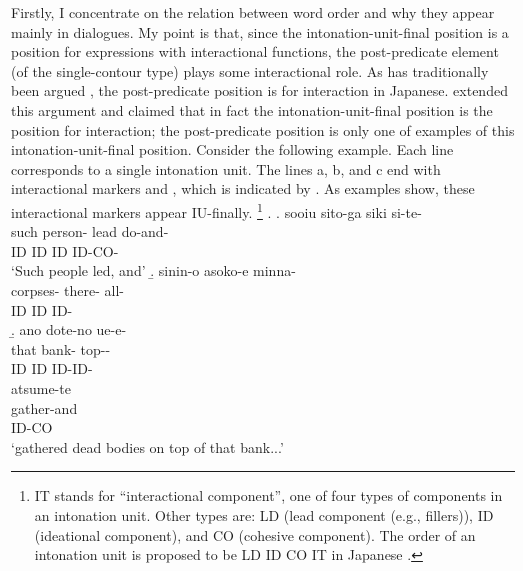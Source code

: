 Firstly, I concentrate on the relation between word order and why they appear mainly in dialogues.
My point is that,
since the intonation-unit-final position is a position for expressions with interactional functions,
the post-predicate element (of the single-contour type) plays some interactional role.
As has traditionally been argued \cite[e.g.,][]{watanabe71},
the post-predicate position is for interaction in Japanese.
 extended this argument and claimed that
in fact the intonation-unit-final position is the position for interaction;
the post-predicate position is only one of examples of this intonation-unit-final position.
Consider the following example.
Each line corresponds to a single intonation unit.
The lines a, b, and c end with interactional markers  and ,
which is indicated by .%
As examples \Next show,
these interactional markers appear IU-finally.
	\footnote{
	IT stands for ``interactional component'',
	one of four types of components in an intonation unit.
	Other types are:
	LD (lead component (e.g., fillers)),
	ID (ideational component), and
	CO (cohesive component).
	The order of an intonation unit is proposed to be
	LD ID CO IT in Japanese \cite[][p.~44]{iwasaki93}.
	}
%
\ex.
 \a.
 \glll sooiu sito-ga siki si-te- \\
 	such person- lead do-and- \\
	ID ID ID ID-CO-	 \\
	\glt `Such people led, and'
 \b.
 \glll sinin-o asoko-e minna- \\
 		corpses- there- all- \\
		ID ID ID- \\
 \b.
 \glll ano dote-no ue-e- \\
 		that bank- top-- \\
		ID ID ID-ID- \\
 \glll atsume-te \\
 		gather-and \\
		ID-CO \\
	\glt `gathered dead bodies on top of that bank...'
	\hfill{\cite[][p.~47, gloss and transcription modified by the current author]{iwasaki93}}

